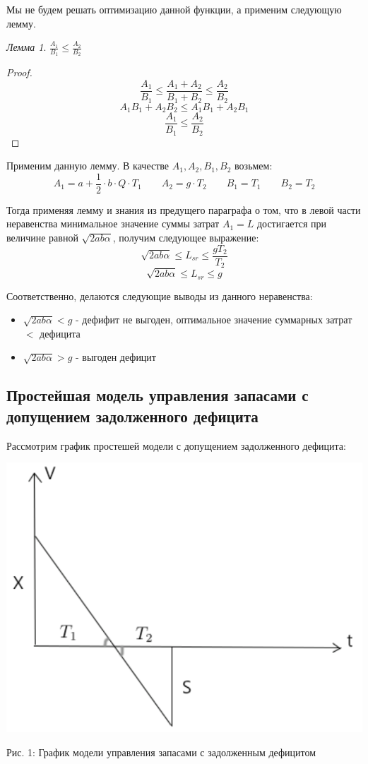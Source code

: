 \documentclass[aps,%
12pt,%
final,%
oneside,
onecolumn,%
musixtex, %
superscriptaddress,%
centertags]{article} %
\theoremstyle{plain}
\theoremstyle{definition}
\theoremstyle{remark}
\newtheorem{lemma}{Лемма}[section]
\begin{document}
Мы не будем решать оптимизацию данной функции, а применим следующую лемму.
\begin{lemma}
	$\frac{A_1}{B_1} \leq \frac{A_2}{B_2}$
\end{lemma}
\begin{proof}
	$$\frac{A_1}{B_1} \leq \frac{A_1+A_2}{B_1+B_2} \leq \frac{A_2}{B_2}$$
	$$A_1B_1 +A_2B_2 \leq A_1B_1 + A_2B_1$$
	$$\frac{A_1}{B_1} \leq \frac{A_2}{B_2}$$
\end{proof}

Применим данную лемму. В качестве $A_1,A_2,B_1,B_2$ возьмем:
$$A_1 =a+\frac{1}{2} \cdot b \cdot Q \cdot T_1 \qquad A_2 = g \cdot T_2 \qquad B_1 = T_1 \qquad B_2 = T_2$$

Тогда применяя лемму и знания из предущего параграфа о том, что в левой части неравенства минимальное значение суммы затрат $A_1=L$ достигается при величине равной $\sqrt{2ab\alpha}$, получим следующее выражение:
$$\sqrt{2ab\alpha} \leq L_{sr} \leq \frac{gT_2}{T_2}$$
$$\sqrt{2ab\alpha} \leq L_{sr} \leq g$$

Соответственно, делаются следующие выводы из данного неравенства:
\begin{itemize}
	\item $\sqrt{2ab\alpha} < g$ - дефифит не выгоден, оптимальное значение суммарных затрат $<$ дефицита
	\item $\sqrt{2ab\alpha} > g$ - выгоден дефицит
\end{itemize}

\newpage
\subsection{Простейшая модель управления запасами с допущением задолженного дефицита}

Рассмотрим график простешей модели с допущением задолженного дефицита:
\begin{center}
  \includegraphics[scale=0.37]{images/1.png}

  Рис. 1: График модели управления запасами с задолженным дефицитом
\end{center}
\end{document}
